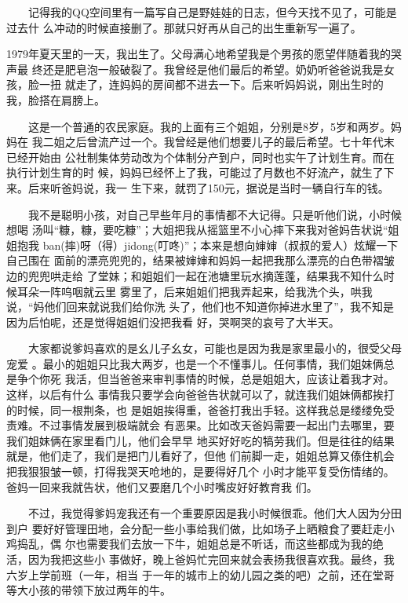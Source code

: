 \documentclass[12pt]{book}
\begin{document}
　　记得我的QQ空间里有一篇写自己是野娃娃的日志，但今天找不见了，可能是过去什
么冲动的时候直接删了。那就只好再从自己的出生重新写一遍了。

    1979年夏天里的一天，我出生了。父母满心地希望我是个男孩的愿望伴随着我的哭声最
终还是肥皂泡一般破裂了。我曾经是他们最后的希望。奶奶听爸爸说我是女孩，脸一扭
就走了，连妈妈的房间都不进去一下。后来听妈妈说，刚出生时的我，脸搭在肩膀上。

　　这是一个普通的农民家庭。我的上面有三个姐姐，分别是8岁，5岁和两岁。妈妈在
我二姐之后曾流产过一个。我曾经是他们想要儿子的最后希望。七十年代末已经开始由
公社制集体劳动改为个体制分产到户，同时也实午了计划生育。而在执行计划生育的时
候，妈妈已经怀上了我，可能过了月数也不好流产，就生了下来。后来听爸妈说，我一
生下来，就罚了150元，据说是当时一辆自行车的钱。

　　我不是聪明小孩，对自己早些年月的事情都不大记得。只是听他们说，小时候想喝
汤叫“糠，糠，要吃糠”；大姐把我从摇篮里不小心摔下来我对爸妈告状说“姐姐抱我
ban(摔)呀（得）jidong(叮咚)”；本来是想向婶婶（叔叔的爱人）炫耀一下自己围在
面前的漂亮兜兜的，结果被婶婶和妈妈一起把我那么漂亮的白色带褶皱边的兜兜哄走给
了堂妹；和姐姐们一起在池塘里玩水摘莲蓬，结果我不知什么时候耳朵一阵呜咽就云里
雾里了，后来姐姐们把我弄起来，给我洗个头，哄我说，“妈他们回来就说我们给你洗
头了，他们也不知道你掉进水里了”，我不知是因为后怕呢，还是觉得姐姐们没把我看
好，哭啊哭的哀号了大半天。

　　大家都说爹妈喜欢的是幺儿子幺女，可能也是因为我是家里最小的，很受父母宠爱
。最小的姐姐只比我大两岁，也是一个不懂事儿。任何事情，我们姐妹俩总是争个你死
我活，但当爸爸来审判事情的时候，总是姐姐大，应该让着我才对。这样，以后有什么
事情我只要学会向爸爸告状就可以了，就连我们姐妹俩都挨打的时候，同一根荆条，也
是姐姐挨得重，爸爸打我出手轻。这样我总是缕缕免受责难。不过事情发展到极端就会
有恶果。比如改天爸妈需要一起出门去哪里，要我们姐妹俩在家里看门儿，他们会早早
地买好好吃的犒劳我们。但是往往的结果就是，他们走了，我们是把门儿看好了，但他
们前脚一走，姐姐总算又傣住机会把我狠狠皱一顿，打得我哭天呛地的，是要得好几个
小时才能平复受伤情绪的。爸妈一回来我就告状，他们又要磨几个小时嘴皮好好教育我
们。

　　不过，我觉得爹妈宠我还有一个重要原因是我小时候很乖。他们大人因为分田到户
要好好管理田地，会分配一些小事给我们做，比如场子上晒粮食了要赶走小鸡捣乱，偶
尔也需要我们去放一下牛，姐姐总是不听话，而这些都成为我的绝活，因为我把这些小
事做好，晚上爸妈忙完回来就会表扬我很喜欢我。最终，我六岁上学前班（一年，相当
于一年的城市上的幼儿园之类的吧）之前，还在堂哥等大小孩的带领下放过两年的牛。
\end{document}
